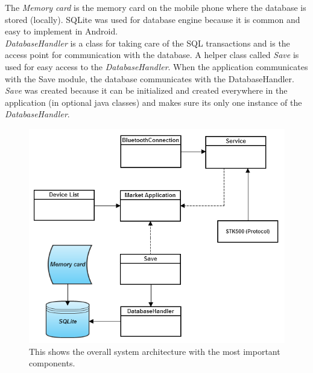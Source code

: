 	The \textit{Memory card} is the memory card on the mobile phone where the database is stored (locally). SQLite was used for database engine because it is common and easy to implement in Android.\\

	\textit{DatabaseHandler} is a class for taking care of the SQL transactions and is the access point for communication with the database. A helper class called \textit{Save} is used for easy access to the \textit{DatabaseHandler}.
	When the application communicates with the Save module, the database communicates with the DatabaseHandler.
	\textit{Save} was created because it can be initialized and created everywhere in the application (in optional java classes) and makes sure its only one instance of the \textit{DatabaseHandler}.

	\begin{figure}[H]
	\centering
	\includegraphics[scale=0.8]{images/System_architecture.png}
	\caption[System Architecture]{This shows the overall system architecture with the most important components.}
	\label{fig:systemarchitecture}
	\end{figure}


